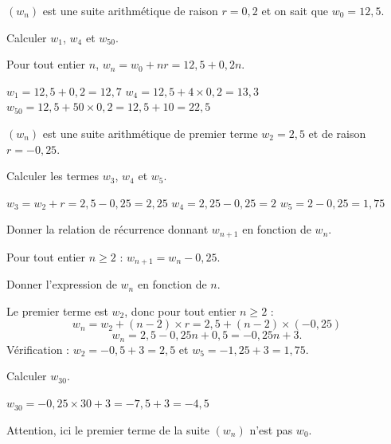 \documentclass[12pt,a4paper]{book}
\begin{document}
\exerciceDS{}

$(w_n)$ est une suite arithmétique de raison $r=0,2$ et on sait que $w_0=12,5$.
\begin{itemMet}
	\item Calculer $w_1$, $w_4$ et $w_{50}$.

	\begin{corrBox}
		Pour tout entier $n$, $w_n=w_0+nr=12,5+0,2n$.

		$w_1=12,5+0,2=12,7$ \qquad $w_4=12,5+4\times 0,2=13,3$ \qquad $w_{50}=12,5+50\times 0,2=12,5+10=22,5$
	\end{corrBox}
\end{itemMet}

\exerciceDS{}

$(w_n)$ est une suite arithmétique de premier terme $w_2=2,5$ et de raison $r=-0,25$.
\begin{enumMet}
	\item Calculer les termes $w_3$, $w_4$ et $w_5$.

	\begin{corrBox}
		$w_3=w_2+r=2,5-0,25=2,25$ \qquad $w_4=2,25-0,25=2$ \qquad $w_5=2-0,25=1,75$
	\end{corrBox}
	\item Donner la relation de récurrence donnant $w_{n+1}$ en fonction de $w_n$.

	\begin{corrBox}
		Pour tout entier $n\geqslant 2$ : $w_{n+1}=w_n-0,25$.
	\end{corrBox}
	\item Donner l'expression de $w_n$ en fonction de $n$.

	\begin{corrBox}
		Le premier terme est $w_2$, donc pour tout entier $n\geqslant 2$ :
		\[w_n=w_2+(n-2)\times r=2,5+(n-2)\times(-0,25)\]
		\[w_n=2,5-0,25n+0,5=-0,25n+3.\]
		Vérification : $w_2=-0,5+3=2,5$ et $w_5=-1,25+3=1,75$.
	\end{corrBox}
	\item Calculer $w_{30}$.

	\begin{corrBox}
		$w_{30}=-0,25\times 30+3=-7,5+3=-4,5$
	\end{corrBox}
\end{enumMet}

\begin{battention}
	Attention, ici le premier terme de la suite $(w_n)$ n'est pas $w_0$.
\end{battention}
\end{document}
